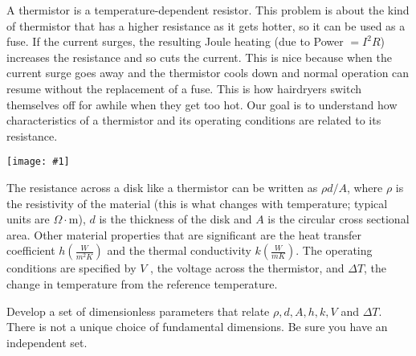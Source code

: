 \documentclass[12pt,letterpaper]{hmcpset}
\newcommand{\diagram}[2]{\begin{center}\texttt{[image: \#1]}\end{center}}
\begin{document}
\begin{problem}[3]
	A thermistor is a temperature-dependent resistor. This problem is about the kind of thermistor
	that has a higher resistance as it gets hotter, so it can be used as a fuse. If the current
	surges, the resulting Joule heating (due to Power $= I^2 R$) increases the resistance and so
	cuts the current. This is nice because when the current surge goes away and the thermistor
	cools down and normal operation can resume without the replacement of a fuse. This is how
	hairdryers switch themselves off for awhile when they get too hot. Our goal is to understand
	how characteristics of a thermistor and its operating conditions are related to its resistance.
	\diagram{Thermistor}{2.5}
	The resistance across a disk like a thermistor can be written as $\rho d/A$, where $\rho$ is the resistivity
	of the material (this is what changes with temperature; typical units are $\Omega\cdot$m), $d$ is the
	thickness of the disk and $A$ is the circular cross sectional area. Other material properties that
	are significant are the heat transfer coefficient $h \left(\frac{W}{m^2 K}\right)$ and the thermal conductivity $k \left(\frac{W}{m K}\right)$.
	The operating conditions are specified by $V$ , the voltage across the thermistor, and $\Delta T$, the
	change in temperature from the reference temperature.
	
	\hspace{0.5 in} Develop a set of dimensionless parameters that relate $\rho, d, A, h, k, V$ and $\Delta T$. There is not a
	unique choice of fundamental dimensions. Be sure you have an independent set.

\end{problem}

\begin{solution}
	\vfill
\end{solution}

\newpage
\end{document}
